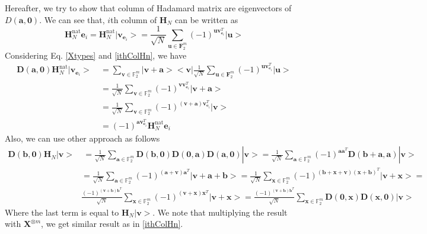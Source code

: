 \documentclass{article}
\begin{document}
Hereafter, we try to show that column of Hadamard matrix are eigenvectors of $D\left(\mathbf{a,0}\right)$. We can see that, $i$th column of $\mathbf{H}_N$ can be written as 
\begin{equation}\label{ithColHn}
	\mathbf{H}_N^{\text{nat}} \mathbf{e}_i = \mathbf{H}_N^{\text{nat}} | \mathbf{v}_{\mathbf{e}_i}> = \frac{1}{\sqrt{N}} \sum_{\mathbf{u} \in \mathbf{F}_2^m}{\left(-1\right)^{\mathbf{u} \mathbf{v}_{\mathbf{e}_i}^T } |\mathbf{u}>}
\end{equation}
Considering Eq. \eqref{Xtypes} and \eqref{ithColHn}, we have
\begin{align*}
	\mathbf{D}\left(\mathbf{a}, \mathbf{0} \right) \mathbf{H}_N^{\text{nat}} | \mathbf{v}_{\mathbf{e}_i} > \: & = \sum_{\mathbf{v} \in \mathbb{F}_2^m}{|\mathbf{v+a}><\mathbf{v}|}  \frac{1}{\sqrt{N}} \sum_{\mathbf{u} \in \mathbf{F}_2^m}{\left(-1\right)^{\mathbf{u} \mathbf{v}_{\mathbf{e}_i}^T } |\mathbf{u} > } \\
	& = \frac{1}{\sqrt{N}} \sum_{\mathbf{v} \in \mathbb{F}_2^m}{(-1)^{\mathbf{v}\mathbf{v}_{\mathbf{e}_i}^T } |\mathbf{v+a}>} \\
	& = \frac{1}{\sqrt{N}} \sum_{\mathbf{v} \in \mathbb{F}_2^m}{(-1)^{\left(\mathbf{v+a}\right)\mathbf{v}_{\mathbf{e}_i}^T } |\mathbf{v}>}\\
	& = (-1)^{\mathbf{a}\mathbf{v}_{\mathbf{e}_i}^T} \mathbf{H}_N^{\text{nat}} \mathbf{e}_i
\end{align*} 
Also, we can use other approach as follows
\begin{align*}
	\mathbf{D}\left(\mathbf{b},\mathbf{0}\right) \mathbf{H}_N |\mathbf{v}>& \: = \frac{1}{\sqrt{N}}\sum_{\mathbf{a} \in \mathbb{F}_2^m}{\mathbf {D}\left(\mathbf{b},\mathbf{0}\right) \mathbf{D}\left(\mathbf{0},\mathbf{a}\right) \mathbf{D}\left(\mathbf{a},\mathbf{0}\right)}|\mathbf{v}> = \frac{1}{\sqrt{N}}\sum_{\mathbf{a} \in \mathbb{F}_2^m}{(-1)^{\mathbf{a}\mathbf{a}^T} \mathbf{D}\left(\mathbf{b}+\mathbf{a},\mathbf{a}\right)}|\mathbf{v}> \\
	& = \frac{1}{\sqrt{N}}\sum_{\mathbf{a} \in \mathbb{F}_2^m}{(-1)^{(\mathbf{a+v})\mathbf{a}^T} | \mathbf{v}+\mathbf{a}+\mathbf{b}>}=\frac{1}{\sqrt{N}}\sum_{\mathbf{x} \in \mathbb{F}_2^m}{(-1)^{(\mathbf{b+x+v})(\mathbf{x+b})^T} | \mathbf{v}+\mathbf{x}>}= \\
	&\frac{(-1)^{(\mathbf{v+b})
			\mathbf{b}^T }}{\sqrt{N}}\sum_{\mathbf{x} \in \mathbb{F}_2^m}{(-1)^{(\mathbf{v+x})\mathbf{x}^T} | \mathbf{v}+\mathbf{x}>}=\frac{(-1)^{(\mathbf{v+b})
			\mathbf{b}^T }}{\sqrt{N}}\sum_{\mathbf{x} \in \mathbb{F}_2^m}{\mathbf{D}(\mathbf{0, x}) \mathbf{D}(\mathbf{x, 0})}|\mathbf{v}>
\end{align*}
Where the last term is equal to $\mathbf{H}_N | \mathbf{v}>$. We note that multiplying the result with $\mathbf{X}^{\otimes m}$, we get similar result as in \eqref{ithColHn}.
\end{document}
